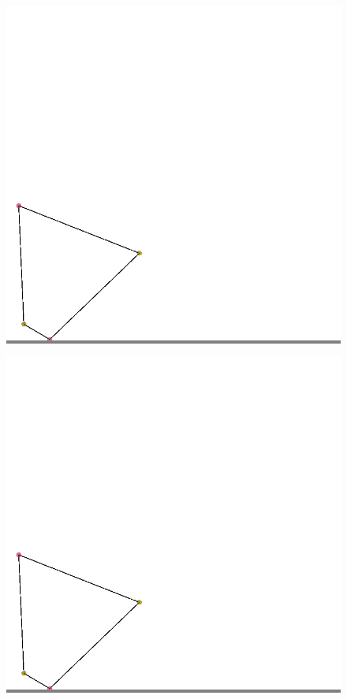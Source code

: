 \documentclass{article}
\begin{document}
\begin{figure}
\begin{minipage}{0.3\textwidth}
            \colorbox{gray}{\includegraphics[width=\linewidth]{./images/no-tails-wt.png}}
            \end{minipage}
            \hspace{\fill}
            \begin{minipage}{0.3\textwidth}
            \colorbox{gray}{\includegraphics[width=\linewidth]{./images/major-comp-wt.png}}

\end{minipage}
\end{figure}
\end{document}
